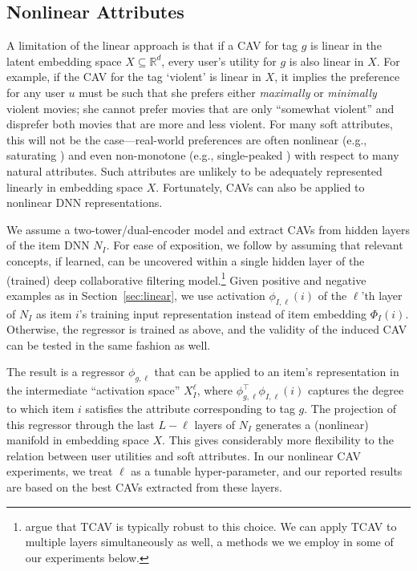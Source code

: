 \documentclass[manuscript,screen,nonacm]{acmart}
\newcommand{\R}{\mathbb{R}}
\newcommand{\1}{{\mathbf 1}}
\theoremstyle{TheoremNum}
\begin{document}
\subsection{Nonlinear Attributes}
\label{sec:nonlinear}

A limitation of the linear approach is that if a CAV for tag $g$ is linear in the latent embedding space $X\subseteq \R^d$, every user's utility for $g$ is also linear in $X$. For example,
if the CAV for the tag `violent' is linear in $X$, it implies the preference for any user $u$ must be such that she prefers either \emph{maximally} or \emph{minimally} violent movies; she cannot prefer movies that are only ``somewhat violent'' and disprefer both movies that are more and less violent. For many soft attributes, this will not be the case---real-world preferences are often nonlinear (e.g., saturating \cite{french}) and even non-monotone (e.g., single-peaked \cite{moulin:PC80,regenwetter-BSC:2006}) with respect to many natural attributes. Such attributes are unlikely to be adequately represented linearly in embedding space $X$. Fortunately, CAVs can also be applied to nonlinear DNN representations.

We assume a two-tower/dual-encoder model and extract 
CAVs from hidden layers of the item DNN $N_I$.
For ease of exposition, we follow \citet{kimTCAV:icml18} by assuming that relevant concepts, if learned, can be uncovered within a single hidden layer of the (trained) deep collaborative filtering model.\footnote{\citet{kimTCAV:icml18} argue that TCAV is typically robust to this choice. We can apply TCAV to multiple layers simultaneously as well, a methods we we employ in some of our experiments below.} Given positive and negative examples as in Section~\ref{sec:linear}, we use activation $\phi_{I,\ell}(i)$ of the $\ell$'th layer of $N_I$ as item $i$'s training input representation instead of item embedding $\Phi_I(i)$.
Otherwise, the regressor is trained as above, and the validity of the induced CAV can be tested in the same fashion as well.

The result is a regressor $\phi_{g,\ell}$ that can be applied to an item's representation in the intermediate ``activation space'' $X^\ell_I$, where
$\phi_{g,\ell}^\top \phi_{I,\ell}(i)$ captures the degree to which item $i$ satisfies the attribute corresponding to tag $g$. The projection of this regressor through the last $L-\ell$ layers of
$N_I$ generates a (nonlinear) manifold in embedding space $X$. This gives considerably more flexibility to the relation between user utilities and soft attributes. In our nonlinear CAV experiments, we treat $\ell$ as a tunable hyper-parameter, and our reported results are based on the best CAVs extracted from these layers. 
\end{document}
